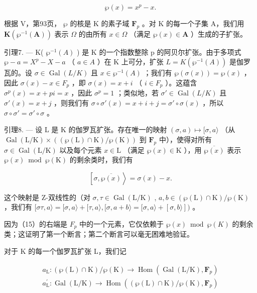 \[
\wp (x) = x ^ {p} - x.
\]

根据 V，第93页， \(\wp\) 的核是 K 的素子域 \(\mathbf{F}_p\) 。对 K 的每一个子集 A，我们用 \(\mathbf{K}(\wp^{-1}(\mathbf{A}))\) 表示 \(\Omega\) 的由所有 \(x \in \Omega\) （满足 \(\wp(x) \in \mathbf{A}\) ）生成的子扩张。

引理7. --- K( \(\wp^{-1}(A)\) ) 是 K 的一个指数整除 p 的阿贝尔扩张。由于多项式 \(\wp - a = X^{p} - X - a\) （ \(a \in A\) ）在 K 上可分，扩张 \(L = K(\wp^{-1}(A))\) 是伽罗瓦的。设 \(\sigma \in \operatorname{Gal}(L/K)\) 且 \(x \in \wp^{-1}(A)\) ；我们有 \(\wp(\sigma(x)) = \wp(x)\) ，因此 \(\sigma(x) - x \in F_{p}\) ，即 \(\sigma(x) = x + i\) （ \(i \in F_{p}\) ）。这蕴含 \(\sigma^{p}(x) = x + pi = x\) ，因此 \(\sigma^{p} = 1\) ；类似地，若 \(\sigma' \in \operatorname{Gal}(L/K)\) 且 \(\sigma'(x) = x + j\) ，则我们有 \(\sigma \circ \sigma'(x) = x + i + j = \sigma' \circ \sigma(x)\) ，所以 \(\sigma \circ \sigma' = \sigma' \circ \sigma\) 。

引理8. --- 设 L 是 K 的伽罗瓦扩张。存在唯一的映射 \((\sigma, a) \mapsto [\sigma, a\rangle\) （从 \(\operatorname{Gal}(\mathrm{L} / \mathrm{K}) \times ((\wp(\mathrm{L}) \cap \mathrm{K}) / \wp(\mathrm{K}))\) 到 \(\mathbf{F}_p\) 中），使得对所有 \(\sigma \in \operatorname{Gal}(\mathrm{L} / \mathrm{K})\) 以及每个元素 \(x \in \mathrm{L}\) （满足 \(\wp(x) \in \mathrm{K}\) ），用 \(\overline{\wp(x)}\) 表示 \(\wp(x) \bmod \wp(\mathrm{K})\) 的剩余类时，我们有

\[
\left[ \sigma , \overline {{{\wp (x)}}} \right\rangle = \sigma (x) - x.\tag{15}
\]

这个映射是 Z-双线性的（对 \(\sigma, \tau \in \operatorname{Gal}(\mathrm{L} / \mathrm{K})\) , \(a, b \in (\wp(\mathrm{L}) \cap \mathrm{K}) / \wp(\mathrm{K})\) ，我们有 \([\sigma \tau, a\rangle = [\sigma, a\rangle + [\tau, a\rangle, [\sigma, a + b\rangle = [\sigma, a\rangle + [\sigma, b\rangle])\) 。

因为（15）的右端是 \(F_{p}\) 中的一个元素，它仅依赖于 \(\wp(x)\bmod\wp(K)\) 的剩余类；这证明了第一个断言；第二个断言可以毫无困难地验证。

对于 K 的每一个伽罗瓦扩张 L，我们记

\[
\begin{array}{l} a _ {\mathrm{L}} \colon (\wp (\mathrm{L}) \cap \mathrm{K}) / \wp (\mathrm{K}) \to \operatorname{Hom} \left(\operatorname{Gal} (\mathrm{L} / \mathrm{K}), \mathbf {F} _ {p}\right) \\ a _ {\mathrm{L}} ^ {\prime} \colon \operatorname{Gal} (\mathrm{L} / \mathrm{K}) \to \operatorname{Hom} \left((\wp (\mathrm{L}) \cap \mathrm{K}) / \wp (\mathrm{K}), \mathbf {F} _ {p}\right) \end{array}
\]


